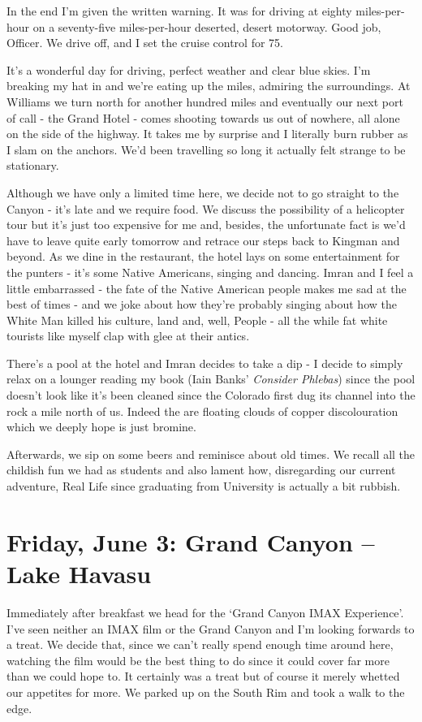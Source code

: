 \documentclass[a5paper,titlepage,11pt]{book}
\begin{document}
In the end I'm given the written warning. It was for driving at eighty miles-per-hour on a seventy-five miles-per-hour deserted, desert motorway. Good job, Officer. We drive off, and I set the cruise control for 75.

It's a wonderful day for driving, perfect weather and clear blue skies. I'm breaking my hat in and we're eating up the miles, admiring the surroundings. At Williams we turn north for another hundred miles and eventually our next port of call - the Grand Hotel - comes shooting towards us out of nowhere, all alone on the side of the highway. It takes me by surprise and I literally burn rubber as I slam on the anchors. We'd been travelling so long it actually felt strange to be stationary.

Although we have only a limited time here, we decide not to go straight to the Canyon - it's late and we require food. We discuss the possibility of a helicopter tour but it's just too expensive for me and, besides, the unfortunate fact is we'd have to leave quite early tomorrow and retrace our steps back to Kingman and beyond. As we dine in the restaurant, the hotel lays on some entertainment for the punters - it's some Native Americans, singing and dancing. Imran and I feel a little embarrassed - the fate of the Native American people makes me sad at the best of times - and we joke about how they're probably singing about how the White Man killed his culture, land and, well, People - all the while fat white tourists like myself clap with glee at their antics.

There's a pool at the hotel and Imran decides to take a dip - I decide to simply relax on a lounger reading my book (Iain Banks' \emph{Consider Phlebas}) since the pool doesn't look like it's been cleaned since the Colorado first dug its channel into the rock a mile north of us. Indeed the are floating clouds of copper discolouration which we deeply hope is just bromine.

Afterwards, we sip on some beers and reminisce about old times. We recall all the childish fun we had as students and also lament how, disregarding our current adventure, Real Life since graduating from University is actually a bit rubbish.

\chapter[Grand Canyon -- Lake Havasu]{Friday, June 3: Grand Canyon -- Lake Havasu}
Immediately after breakfast we head for the `Grand Canyon IMAX Experience'. I've seen neither an IMAX film or the Grand Canyon and I'm looking forwards to a treat. We decide that, since we can't really spend enough time around here, watching the film would be the best thing to do since it could cover far more than we could hope to. It certainly was a treat but of course it merely whetted our appetites for more. We parked up on the South Rim and took a walk to the edge.
\end{document}
